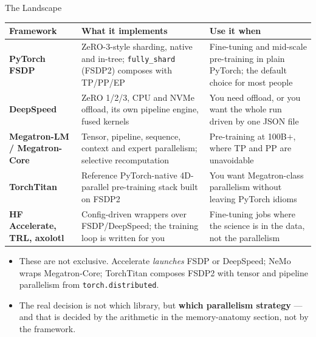 \begin{frame}{The Landscape}
  \centering
  \scriptsize
  \begin{tabular}{@{}p{2.5cm}p{4.1cm}p{5.2cm}@{}}
    \toprule
    \textbf{Framework} & \textbf{What it implements} & \textbf{Use it when} \\
    \midrule
    \textbf{PyTorch FSDP} &
      ZeRO-3-style sharding, native and in-tree; \texttt{fully\_shard} (FSDP2) composes with TP/PP/EP &
      Fine-tuning and mid-scale pre-training in plain PyTorch; the default choice for most people \\
    \addlinespace[0.2em]
    \textbf{DeepSpeed} &
      ZeRO 1/2/3, CPU and NVMe offload, its own pipeline engine, fused kernels &
      You need offload, or you want the whole run driven by one JSON file \\
    \addlinespace[0.2em]
    \textbf{Megatron-LM \newline / Megatron-Core} &
      Tensor, pipeline, sequence, context and expert parallelism; selective recomputation &
      Pre-training at 100B$+$, where TP and PP are unavoidable \\
    \addlinespace[0.2em]
    \textbf{TorchTitan} &
      Reference PyTorch-native 4D-parallel pre-training stack built on FSDP2 &
      You want Megatron-class parallelism without leaving PyTorch idioms \\
    \addlinespace[0.2em]
    \textbf{HF Accelerate, \newline TRL, axolotl} &
      Config-driven wrappers over FSDP/DeepSpeed; the training loop is written for you &
      Fine-tuning jobs where the science is in the data, not the parallelism \\
    \bottomrule
  \end{tabular}
  \vspace{0.21em}
  \begin{itemize}\scriptsize\itemsep0.05em
    \item[\textcolor{red}{$\blacktriangleright$}] These are not exclusive. Accelerate \emph{launches} FSDP or DeepSpeed; NeMo wraps Megatron-Core; TorchTitan composes FSDP2 with tensor and pipeline parallelism from \texttt{torch.distributed}.
    \item[\textcolor{red}{$\blacktriangleright$}] The real decision is not which library, but \textbf{which parallelism strategy} --- and that is decided by the arithmetic in the memory-anatomy section, not by the framework.
  \end{itemize}
\end{frame}

